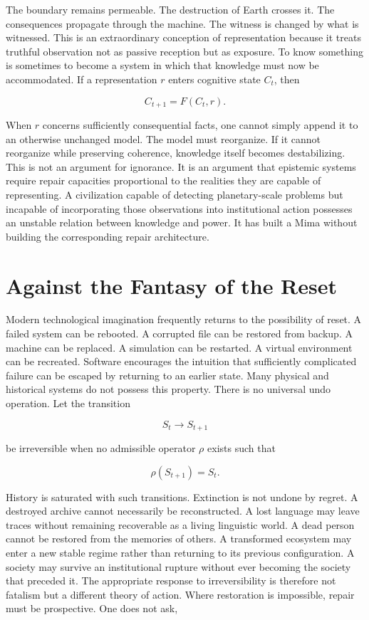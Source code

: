 \documentclass[11pt,oneside]{book}
\theoremstyle{definition}
\theoremstyle{remark}
\begin{document}
The boundary remains permeable. The destruction of Earth crosses it. The consequences propagate
through the machine. The witness is changed by what is witnessed. This is an extraordinary
conception of representation because it treats truthful observation not as passive reception but as
exposure. To know something is sometimes to become a system in which that knowledge must now be
accommodated. If a representation \(r\) enters cognitive state \(C_t\), then

\[
C_{t+1}=F(C_t,r).
\]

When \(r\) concerns sufficiently consequential facts, one cannot simply append it to an otherwise
unchanged model. The model must reorganize. If it cannot reorganize while preserving coherence,
knowledge itself becomes destabilizing. This is not an argument for ignorance. It is an argument
that epistemic systems require repair capacities proportional to the realities they are capable of
representing. A civilization capable of detecting planetary-scale problems but incapable of
incorporating those observations into institutional action possesses an unstable relation between
knowledge and power. It has built a Mima without building the corresponding repair architecture.

\section*{Against the Fantasy of the Reset}

Modern technological imagination frequently returns to the possibility of reset. A failed system can
be rebooted. A corrupted file can be restored from backup. A machine can be replaced. A simulation
can be restarted. A virtual environment can be recreated. Software encourages the intuition that
sufficiently complicated failure can be escaped by returning to an earlier state. Many physical and
historical systems do not possess this property. There is no universal undo operation. Let the
transition

\[
S_t\rightarrow S_{t+1}
\]

be irreversible when no admissible operator \(\rho\) exists such that

\[
\rho(S_{t+1})=S_t.
\]

History is saturated with such transitions. Extinction is not undone by regret. A destroyed archive
cannot necessarily be reconstructed. A lost language may leave traces without remaining recoverable
as a living linguistic world. A dead person cannot be restored from the memories of others. A
transformed ecosystem may enter a new stable regime rather than returning to its previous
configuration. A society may survive an institutional rupture without ever becoming the society that
preceded it. The appropriate response to irreversibility is therefore not fatalism but a different
theory of action. Where restoration is impossible, repair must be prospective. One does not ask,
\end{document}
